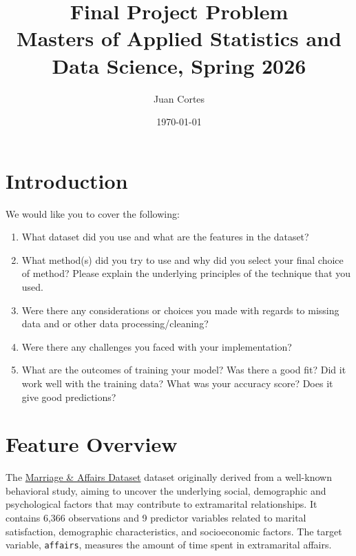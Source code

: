 \documentclass[12pt]{article}
\title{
Final Project Problem\\
\large Masters of Applied Statistics and Data Science, Spring 2026
}
\author{Juan Cortes}
\date{\today}
\begin{document}
\maketitle

\section{Introduction}

We would like you to cover the following:

\begin{enumerate}
    \item What dataset did you use and what are the features in the dataset?
    \item What method(s) did you try to use and why did you select your final choice of method? Please explain the underlying principles of the technique that you used.
    \item Were there any considerations or choices you made with regards to missing data and or other data processing/cleaning?
     \item Were there any challenges you faced with your implementation?
     \item What are the outcomes of training your model? Was there a good fit? Did it work well with the training data? What was your accuracy score? Does it give good predictions?
\end{enumerate}

\section{Feature Overview}

The \href{https://www.kaggle.com/datasets/evilspirit05/affair-dataset/data}
{Marriage \& Affairs Dataset} dataset originally derived from a well-known behavioral study, aiming to uncover the underlying social, demographic and psychological factors that may contribute to extramarital relationships. It contains 6,366 observations and 9 predictor variables related to marital satisfaction, demographic characteristics, and socioeconomic factors. The target variable, \texttt{affairs}, measures the amount of time spent in extramarital affairs.
\end{document}
